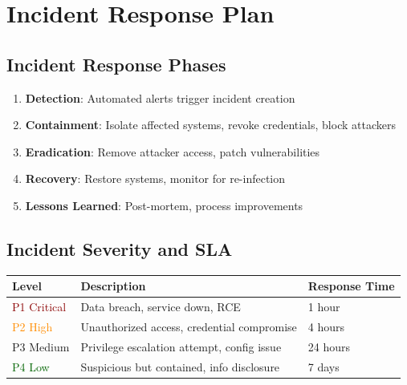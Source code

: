 \documentclass{report}
\begin{document}
\section{Incident Response Plan}

\subsection{Incident Response Phases}

\begin{enumerate}
\item \textbf{Detection}: Automated alerts trigger incident creation
\item \textbf{Containment}: Isolate affected systems, revoke credentials, block attackers
\item \textbf{Eradication}: Remove attacker access, patch vulnerabilities
\item \textbf{Recovery}: Restore systems, monitor for re-infection
\item \textbf{Lessons Learned}: Post-mortem, process improvements
\end{enumerate}

\subsection{Incident Severity and SLA}

\begin{table}[h]
\centering
\small
\begin{tabular}{|l|p{2.5cm}|p{2.5cm}|}
\hline
\textbf{Level} & \textbf{Description} & \textbf{Response Time} \\
\hline
\textcolor{darkred}{P1 Critical} & Data breach, service down, RCE & 1 hour \\
\hline
\textcolor{darkorange}{P2 High} & Unauthorized access, credential compromise & 4 hours \\
\hline
\textcolor{darkyellow}{P3 Medium} & Privilege escalation attempt, config issue & 24 hours \\
\hline
\textcolor{darkgreen}{P4 Low} & Suspicious but contained, info disclosure & 7 days \\
\hline
\end{tabular}
\end{table}
\end{document}
